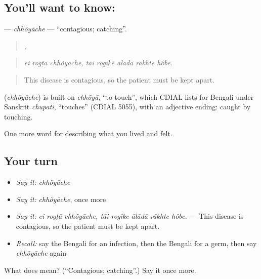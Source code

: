 \subsection*{You'll want to know: }
\textbf{} — \emph{chhõyāche} — \textquotedblleft{}contagious; catching\textquotedblright{}.

\begin{quote}
  ,     
\end{quote}

\begin{quote}
\emph{ei rogṭā chhõyāche, tāi rogīke ālādā rākhte hôbe.}
\end{quote}

\begin{quote}
This disease is contagious, so the patient must be kept apart.
\end{quote}

\begin{cousinweb}
\textbf{} (\emph{chhõyāche}) is built on \emph{chhõyā}, \textquotedblleft{}to touch\textquotedblright{}, which CDIAL lists for Bengali under Sanskrit \emph{chupati}, \textquotedblleft{}touches\textquotedblright{} (CDIAL 5055), with an adjective ending: caught by touching.
\end{cousinweb}

\begin{grammarlens}[title={What you've built}]
One more word for describing what you lived and felt.
\end{grammarlens}

\subsection*{Your turn}
\begin{itemize}
\raggedright
  \item \emph{Say it:} \emph{chhõyāche}
  \item \emph{Say it:} \emph{chhõyāche}, once more
  \item \emph{Say it:} \emph{ei rogṭā chhõyāche, tāi rogīke ālādā rākhte hôbe.} — This disease is contagious, so the patient must be kept apart.
  \item \emph{Recall:} say the Bengali for an infection, then the Bengali for a germ, then say \emph{chhõyāche} again
\end{itemize}

\begin{tcolorbox}[breakable,colback=teal!4,colframe=teal!35!black,title={Before you move on}]
What does  mean? (\textquotedblleft{}Contagious; catching\textquotedblright{}.) Say it once more.
\end{tcolorbox}
